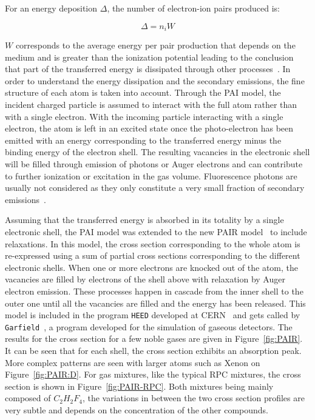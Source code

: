 	For an energy deposition $\Delta$, the number of electron-ion pairs produced is:
	
	\begin{equation}
	\label{eq:npairs}
	\Delta = n_iW
	\end{equation}
	
	\vspace*{3mm}
	$W$ corresponds to the average energy per pair production that depends on the medium and is greater than the ionization potential leading to the conclusion that part of the transferred energy is dissipated through other processes~\cite{VINCENT2017,ICRU31}. In order to understand the energy dissipation and the secondary emissions, the fine structure of each atom is taken into account. Through the PAI model, the incident charged particle is assumed to interact with the full atom rather than with a single electron. With the incoming particle interacting with a single electron, the atom is left in an excited state once the photo-electron has been emitted with an energy corresponding to the transferred energy minus the binding energy of the electron shell. The resulting vacancies in the electronic shell will be filled through emission of photons or Auger electrons and can contribute to further ionization or excitation in the gas volume. Fluorescence photons are usually not considered as they only constitute a very small fraction of secondary emissions~\cite{SMIRNOV2005}.
	
\endgroup
	
	Assuming that the transferred energy is absorbed in its totality by a single electronic shell, the PAI model was extended to the new \acf{PAIR} model~\cite{SMIRNOV2005} to include relaxations. In this model, the cross section corresponding to the whole atom is re-expressed using a sum of partial cross sections corresponding to the different electronic shells. When one or more electrons are knocked out of the atom, the vacancies are filled by electrons of the shell above with relaxation by Auger electron emission. These processes happen in cascade from the inner shell to the outer one until all the vacancies are filled and the energy has been released. This model is included in the program \texttt{HEED} developed at CERN~\cite{HEED} and gets called by \texttt{Garfield}~\cite{GARFIELD}, a program developed for the simulation of gaseous detectors. The results for the cross section for a few noble gases are given in Figure~\ref{fig:PAIR}. It can be seen that for each shell, the cross section exhibits an absorption peak. More complex patterns are seen with larger atoms such as Xenon on Figure~\ref{fig:PAIR:D}. For gas mixtures, like the typical RPC mixtures, the cross section is shown in Figure~\ref{fig:PAIR-RPC}. Both mixtures being mainly composed of $C_2H_2F_4$, the variations in between the two cross section profiles are very subtle and depends on the concentration of the other compounds.
	
